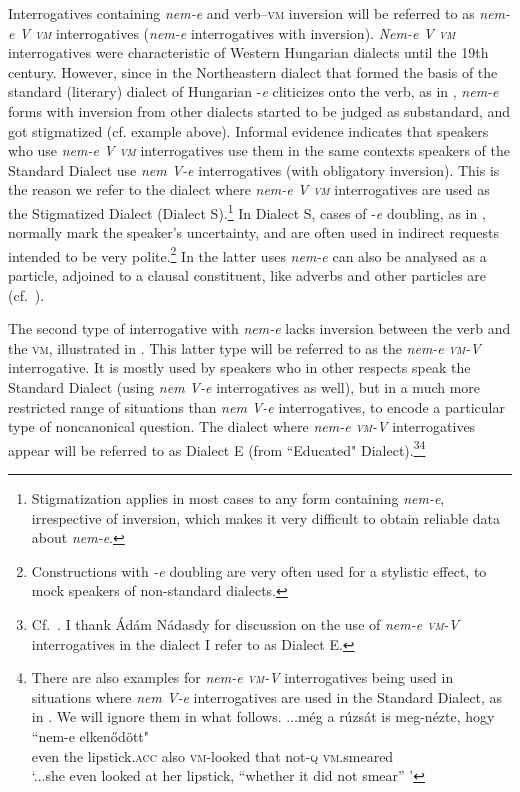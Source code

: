 \documentclass[output=paper,colorlinks,citecolor=brown]{langscibook}
\begin{document}
	\noindent Interrogatives containing \textit{nem-e} and verb–\textsc{vm} inversion will be referred to as  \textit{nem-e V \textsc{vm}} interrogatives (\textit{nem-e} interrogatives with inversion). \textit{Nem-e V \textsc{vm}} interrogatives   were characteristic of Western Hungarian dialects until the 19th century. However, since in the Northeastern dialect that formed the basis of the standard (literary) dialect of Hungarian \nobreakdash-\textit{e} cliticizes onto the verb, as in , \textit{nem-e} forms with inversion from other dialects started to be judged as substandard, and got stigmatized (cf. example  above). Informal evidence indicates that speakers who use \textit{nem-e V \textsc{vm}} interrogatives  use them in the same contexts speakers of the Standard Dialect use \textit{nem V-e} interrogatives (with obligatory inversion). This is the reason we refer to the dialect where \textit{nem\nobreakdash-e V \textsc{vm}} interrogatives  are used as the Stigmatized Dialect (Dialect S).\footnote{Stigmatization applies in most cases to any form containing \textit{nem-e}, irrespective of inversion, which makes it very difficult to obtain reliable data about \textit{nem-e}.} In Dialect S, cases of \nobreakdash-\textit{e} doubling, as in , normally mark the speaker's uncertainty, and are often used in indirect requests intended to be very polite.\footnote{Constructions with \textit{-e} doubling are very often used for a stylistic effect, to mock speakers of non-standard dialects.}  In the latter uses \textit{nem-e} can also be analysed as a particle, adjoined to a clausal constituent, like adverbs and other particles are (cf.~\citealt{gaertner+gyuris12}). 
	
	The second type of interrogative with \textit{nem-e}  lacks inversion between the verb and the \textsc{vm}, illustrated in . This latter type will be referred to as the \textit{nem-e  \textsc{vm}\nobreakdash-V} interrogative. It is mostly used by speakers who in other respects speak the Standard Dialect (using  \textit{nem V-e} interrogatives as well), but in a much more restricted range of situations than \textit{nem V-e}  interrogatives, to encode a particular type of  noncanonical question. The dialect where 
	\textit{nem-e \textsc{vm}-V} interrogatives  appear will be referred  to  as  Dialect E (from ``Educated" Dialect).\footnote{Cf.~\citet[224--227]{nadasdy2004}. I thank Ádám Nádasdy for discussion on the use of \textit{nem-e \textsc{vm}-V} interrogatives in the dialect I refer to as Dialect E.}\footnote{
    There are also examples for \textit{nem-e \textsc{vm}-V} interrogatives being used in situations where \textit{nem V-e} interrogatives are used in the Standard Dialect, as in . We will ignore them in what follows.
    \ea\label{fn:ex:i}
    ...\gll még a rúzsát is meg-nézte, hogy ``nem-e elkenődött" \\
    even the lipstick.\textsc{acc} also \textsc{vm}-looked that not-\textsc{q} \textsc{vm}.smeared\\
    \jambox*{[HNC]}
    \glt `...she even looked at her lipstick, “whether it did not smear” ’
    \z
    } 
	
\end{document}
